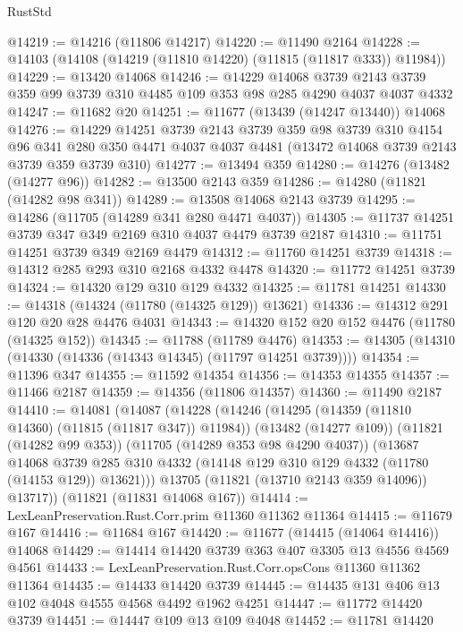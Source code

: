 \begin{lexlean}{RustStd}
\begin{coremodule}
@14219 := @14216 (@11806 @14217)
@14220 := @11490 @2164
@14228 := @14103 (@14108 (@14219 (@11810 @14220) (@11815 (@11817 @333)) @11984))
@14229 := @13420 @14068
@14246 := @14229
    @14068
    @3739
    @2143
    @3739
    @359
    @99
    @3739
    @310
    @4485
    @109
    @353
    @98
    @285
    @4290
    @4037
    @4037
    @4332
@14247 := @11682 @20
@14251 := @11677 (@13439 (@14247 @13440)) @14068
@14276 := @14229
    @14251
    @3739
    @2143
    @3739
    @359
    @98
    @3739
    @310
    @4154
    @96
    @341
    @280
    @350
    @4471
    @4037
    @4037
    @4481
    (@13472 @14068 @3739 @2143 @3739 @359 @3739 @310)
@14277 := @13494 @359
@14280 := @14276 (@13482 (@14277 @96))
@14282 := @13500 @2143 @359
@14286 := @14280 (@11821 (@14282 @98 @341))
@14289 := @13508 @14068 @2143 @3739
@14295 := @14286 (@11705 (@14289 @341 @280 @4471 @4037))
@14305 := @11737 @14251 @3739 @347 @349 @2169 @310 @4037 @4479 @3739 @2187
@14310 := @11751 @14251 @3739 @349 @2169 @4479
@14312 := @11760 @14251 @3739
@14318 := @14312 @285 @293 @310 @2168 @4332 @4478
@14320 := @11772 @14251 @3739
@14324 := @14320 @129 @310 @129 @4332
@14325 := @11781 @14251
@14330 := @14318 (@14324 (@11780 (@14325 @129)) @13621)
@14336 := @14312 @291 @120 @20 @28 @4476 @4031
@14343 := @14320 @152 @20 @152 @4476 (@11780 (@14325 @152))
@14345 := @11788 (@11789 @4476)
@14353 := @14305 (@14310 (@14330 (@14336 (@14343 @14345) (@11797 @14251 @3739))))
@14354 := @11396 @347
@14355 := @11592 @14354
@14356 := @14353 @14355
@14357 := @11466 @2187
@14359 := @14356 (@11806 @14357)
@14360 := @11490 @2187
@14410 := @14081
    (@14087
      (@14228
        (@14246
          (@14295 (@14359 (@11810 @14360) (@11815 (@11817 @347)) @11984))
          (@13482 (@14277 @109))
          (@11821 (@14282 @99 @353))
          (@11705 (@14289 @353 @98 @4290 @4037))
          (@13687
            @14068
            @3739
            @285
            @310
            @4332
            (@14148 @129 @310 @129 @4332 (@11780 (@14153 @129)) @13621)))
        @13705
        (@11821 (@13710 @2143 @359 @14096))
        @13717))
    (@11821 (@11831 @14068 @167))
@14414 := LexLeanPreservation.Rust.Corr.prim @11360 @11362 @11364
@14415 := @11679 @167
@14416 := @11684 @167
@14420 := @11677 (@14415 (@14064 @14416)) @14068
@14429 := @14414 @14420 @3739 @363 @407 @3305 @13 @4556 @4569 @4561
@14433 := LexLeanPreservation.Rust.Corr.opsCons @11360 @11362 @11364
@14435 := @14433 @14420 @3739
@14445 := @14435 @131 @406 @13 @102 @4048 @4555 @4568 @4492 @1962 @4251
@14447 := @11772 @14420 @3739
@14451 := @14447 @109 @13 @109 @4048
@14452 := @11781 @14420

\end{coremodule}
\end{lexlean}
